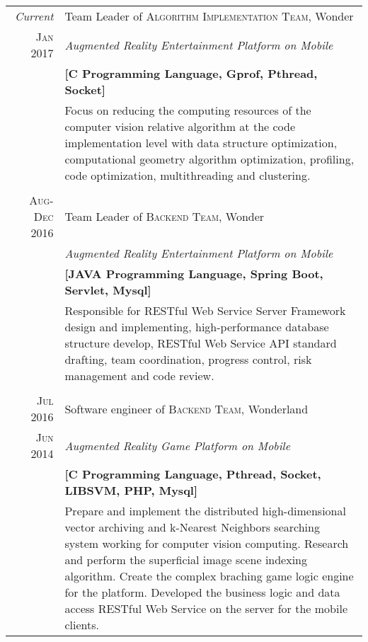 \documentclass[a4paper,10pt]{article}
\begin{document}
\begin{tabular}{r|p{11cm}}

    \emph{Current} & Team Leader of \textsc{Algorithm Implementation Team}, Wonder\\
    \textsc{Jan 2017} & \emph{Augmented Reality Entertainment Platform on Mobile}\\
    &\textbf{[C Programming Language, Gprof, Pthread, Socket]}\\
    &\footnotesize{Focus on reducing the computing resources of the computer vision relative algorithm at the code implementation level with data structure optimization, computational geometry algorithm optimization, profiling, code optimization, multithreading and clustering.}\\
    
    \multicolumn{2}{c}{}\\

    \textsc{Aug-Dec 2016} & Team Leader of \textsc{Backend Team}, Wonder\\
    \textsc & \emph{Augmented Reality Entertainment Platform on Mobile}\\
    &\textbf{[JAVA Programming Language, Spring Boot, Servlet, Mysql]}\\
    &\footnotesize{Responsible for RESTful Web Service Server Framework design and implementing, high-performance database structure develop, RESTful Web Service API standard drafting, team coordination, progress control, risk management and code review.}\\

    \multicolumn{2}{c}{}\\

    \textsc{Jul 2016} & Software engineer of \textsc{Backend Team}, Wonderland\\
    \textsc{Jun 2014} & \emph{Augmented Reality Game Platform on Mobile}\\
    &\textbf{[C Programming Language, Pthread, Socket, LIBSVM, PHP, Mysql]}\\
    &\footnotesize{Prepare and implement the distributed high-dimensional vector archiving and k-Nearest Neighbors searching system working for computer vision computing. Research and perform the superficial image scene indexing algorithm. Create the complex braching game logic engine for the platform. Developed the business logic and data access RESTful Web Service on the server for the mobile clients.}\\

\end{tabular}
\end{document}
